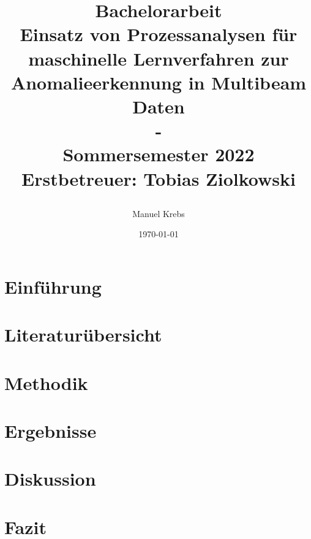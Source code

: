 \documentclass{report}
\title{
	\vspace*{-3cm}
	Bachelorarbeit\\
	Einsatz von Prozessanalysen für maschinelle Lernverfahren zur
	Anomalieerkennung in Multibeam Daten\\
	-\\
	\color{gray}
	Sommersemester 2022\\
	\vspace*{5mm}
	{Erstbetreuer: Tobias Ziolkowski}
	\author{Manuel Krebs}
}
\date{\today}
\begin{document}
	\maketitle	
	\tableofcontents
	\listoffigures
	
	\chapter{Einführung}\label{chp:einführung}
	
	
	\chapter{Literaturübersicht}\label{chp:literaturübersicht}
	
	
	\chapter{Methodik}\label{chp:methodik}
	
	
	\chapter{Ergebnisse}\label{chp:ergebnisse}
	
	
	\chapter{Diskussion}\label{chp:diskussion}
	
	
	\chapter{Fazit}\label{chp:fazit}
	
	
	
	
\end{document}
